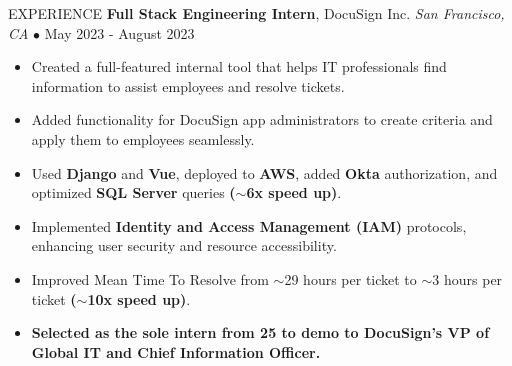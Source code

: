 \documentclass{resume} %
\begin{document}
\begin{rSection}{EXPERIENCE}
\textbf{Full Stack Engineering Intern}, DocuSign Inc. \hfill \textit{San Francisco, CA} $\bullet$ May 2023 - August 2023
\vspace{-2mm}
\begin{itemize}
    \itemsep -6pt {} 
     \item Created a full-featured internal tool that helps IT professionals find information to assist employees and resolve tickets.
     \item Added functionality for DocuSign app administrators to create criteria and apply them to employees seamlessly.
     \item Used \textbf{Django} and \textbf{Vue}, deployed to \textbf{AWS}, added \textbf{Okta} authorization, and optimized \textbf{SQL Server} queries \textbf{(\(\sim \)6x speed up)}.
     \item Implemented \textbf{Identity and Access Management (IAM)} protocols, enhancing user security and resource accessibility.
     \item Improved Mean Time To Resolve from \(\sim \)29 hours per ticket to \(\sim \)3 hours per ticket \textbf{(\(\sim \)10x speed up)}.
     \item \textbf{Selected as the sole intern from 25 to demo to DocuSign's VP of Global IT and Chief Information Officer.} 
\end{itemize}


\end{rSection}
\end{document}
